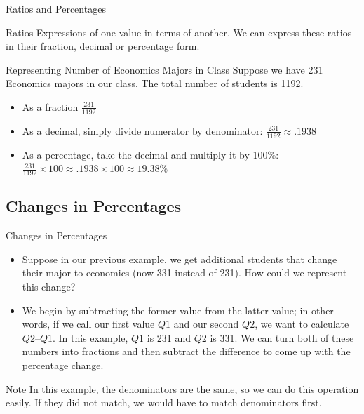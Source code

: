 \documentclass{beamer}
\begin{document}
\begin{frame}{Ratios and Percentages}
  \begin{block}{Ratios}
    Expressions of one value in terms of another. We can express these ratios in their fraction, decimal or percentage form.
  \end{block}

\begin{exampleblock}{Representing Number of Economics Majors in Class}
  Suppose we have 231 Economics majors in our class. The total number of students is 1192.\\

  \begin{itemize}
\item As a fraction $\frac{231}{1192}$

\item As a decimal, simply divide numerator by denominator: $\frac{231}{1192} \approx .1938$

\item As a percentage, take the decimal and multiply it by 100\%: $\frac{231}{1192}\times 100 \approx .1938\times 100 \approx 19.38\%$
\end{itemize}
\end{exampleblock}


\end{frame}

\subsection{Changes in Percentages}

\begin{frame}{Changes in Percentages}
\begin{itemize}
\item Suppose in our previous example, we get additional students that change their major to economics (now 331 instead of 231). How could we represent this change?  
\item  We begin by subtracting the former value from the latter value; in other words, if we call our first value $Q1$ and our second $Q2$, we want to calculate $Q2 – Q1$. In this example, $Q1$ is 231 and $Q2$ is 331. We can turn both of these numbers into fractions and then subtract the difference to come up with the percentage change.
\end{itemize}
\begin{alertblock}{Note}
In this example, the denominators are the same, so we can do this operation easily. If they did not match, we would have to match denominators first.
\end{alertblock}

\end{frame}
\end{document}
